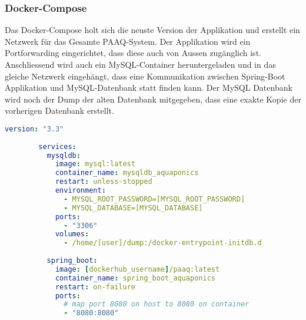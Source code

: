 \documentclass[../main.tex]{subfiles}
\begin{document}
	\subsubsection{Docker-Compose}
	Das Docker-Compose holt sich die neuste Version der Applikation und erstellt ein Netzwerk für das Gesamte PAAQ-System. Der Applikation wird ein Portforwarding eingerichtet, dass diese auch von Aussen zugänglich ist. Anschliessend wird auch ein MySQL-Container heruntergeladen und in das gleiche Netzwerk eingehängt, dass eine Kommunikation zwischen Spring-Boot Applikation und MySQL-Datenbank statt finden kann. Der MySQL Datenbank wird noch der Dump der alten Datenbank mitgegeben, dass eine exakte Kopie der vorherigen Datenbank erstellt.
	\begin{lstlisting}[language=yaml]
		version: "3.3"
		
		services:
		  mysqldb:
		    image: mysql:latest
		    container_name: mysqldb_aquaponics
		    restart: unless-stopped
		    environment:
		      - MYSQL_ROOT_PASSWORD=[MYSQL_ROOT_PASSWORD]
		      - MYSQL_DATABASE=[MYSQL_DATABASE]
		    ports:
		      - "3306"
		    volumes:
		      - /home/[user]/dump:/docker-entrypoint-initdb.d
		      
		  spring_boot:
		    image: [dockerhub_username]/paaq:latest
		    container_name: spring_boot_aquaponics
		    restart: on-failure
		    ports:
		      # map port 8080 on host to 8080 on container
		      - "8080:8080"
	\end{lstlisting}
\end{document}
